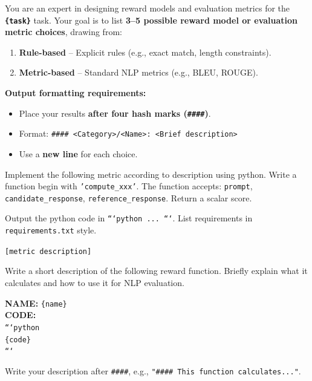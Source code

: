 \begin{tcolorbox}[title={\texttt{LIST\_TASK\_PROMPT}}, breakable, colframe=blue!50!black, colback=blue!5]
You are an expert in designing reward models and evaluation metrics for the \textbf{\texttt{\{task\}}} task.  
Your goal is to list \textbf{3--5 possible reward model or evaluation metric choices}, drawing from:  
\begin{enumerate}
    \item \textbf{Rule-based} -- Explicit rules (e.g., exact match, length constraints).
    \item \textbf{Metric-based} -- Standard NLP metrics (e.g., BLEU, ROUGE).
\end{enumerate}

\textbf{Output formatting requirements:}  
\begin{itemize}
    \item Place your results \textbf{after four hash marks (\texttt{\#\#\#\#})}.
    \item Format: \texttt{\#\#\#\# <Category>/<Name>: <Brief description>}
    \item Use a \textbf{new line} for each choice.
\end{itemize}
\end{tcolorbox}

\begin{tcolorbox}[title={\texttt{WRITE\_CODE\_PROPMT}}, breakable, colframe=blue!50!black, colback=blue!5]
Implement the following metric according to description using python. Write a function begin with \texttt{'compute\_xxx'}. The function accepts: \texttt{prompt}, \texttt{candidate\_response}, \texttt{reference\_response}. Return a scalar score.

Output the python code in \texttt{```python ... ```}. List requirements in \texttt{requirements.txt} style.

\medskip
\texttt{[metric description]}
\end{tcolorbox}

\begin{tcolorbox}[title={\texttt{WRAP\_TOOL\_PROMPT}}, breakable, colframe=blue!50!black, colback=blue!5]
Write a short description of the following reward function. Briefly explain what it calculates and how to use it for NLP evaluation.

\textbf{NAME:} \texttt{\{name\}} \\
\textbf{CODE:} \\
\texttt{```python} \\
\texttt{\{code\}} \\
\texttt{```}

Write your description after \texttt{\#\#\#\#}, e.g., \texttt{"\#\#\#\# This function calculates..."}.
\end{tcolorbox}

